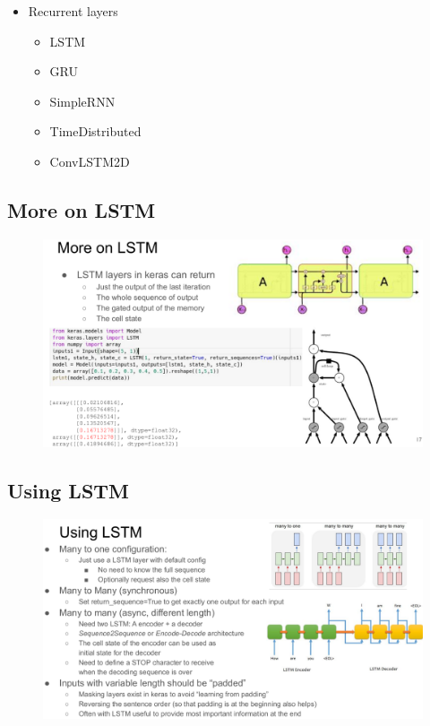 \begin{itemize}
	\item Recurrent layers
	\begin{itemize}
		\item LSTM
		\item GRU
		\item SimpleRNN
		\item TimeDistributed
		\item ConvLSTM2D
	\end{itemize}
\end{itemize}



\subsection{More on LSTM}

\begin{figure}[ht]
	\centering
	\includegraphics[width=1\linewidth]{figure_ml/more_lstm.png}
\end{figure}
\FloatBarrier

\subsection{Using LSTM}

\begin{figure}[ht]
	\centering
	\includegraphics[width=1\linewidth]{figure_ml/using_lstm.png}
\end{figure}
\FloatBarrier


